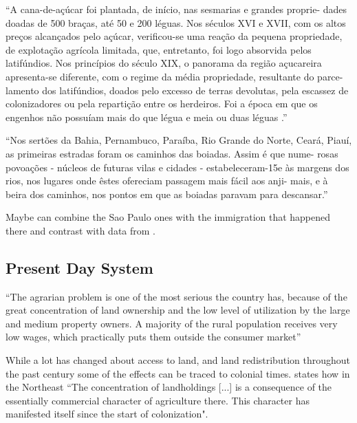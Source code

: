 \documentclass{article}
\begin{document}
``A  cana-de-açúcar foi  plantada,  de  início,  nas sesmarias  e  grandes  proprie- dades  doadas de  500  braças,  até  50  e  200  léguas.  Nos  séculos XVI  e  XVII,  com  os  altos  preços  alcançados  pelo  açúcar,  verificou-se  uma  reação  da  pequena  propriedade,  de  explotação agrícola  limitada,  que,  entretanto,  foi  logo  absorvida  pelos latifúndios. Nos  princípios  do  século  XIX, o panorama da região  açucareira  apresenta-se diferente,  com o  regime da média propriedade, resultante  do parce- lamento  dos  latifúndios,  doados  pelo  excesso  de  terras  devolutas,  pela  escassez  de  colonizadores  ou  pela  repartição  entre  os  herdeiros.  Foi  a  época  em  que  os  engenhos  não  possuíam  mais  do  que  légua  e  meia  ou  duas  léguas .''
\parencite[p.~118]{De_Geografia1970-nk}


``Nos  sertões  da  Bahia,  Pernambuco,  Paraíba,  Rio  Grande  do  Norte,  Ceará,  Piauí, as primeiras estradas foram os  caminhos das boiadas.  Assim  é  que nume- rosas  povoações  - núcleos  de  futuras  vilas  e  cidades  - estabeleceram-15e  às  margens dos rios,  nos lugares onde  êstes ofereciam passagem mais fácil  aos anji- mais,  e  à  beira  dos  caminhos,  nos  pontos  em  que  as  boiadas  paravam  para  descansar.''
\parencite[p.~164]{De_Geografia1970-nk}

\parencite{Panini1990-rj}

Maybe can combine the Sao Paulo ones with the immigration that happened there and contrast with data from \parencite{Rocha2017-yq}.

\subsection{Present Day System}

\textcite[p.~1]{De_Oliveira_Andrade1980-xz}
``The agrarian problem is one of the most serious the country has, because of the great concentration of land ownership and the low level of utilization by the large and medium property owners. A majority of the rural population receives very low wages, which practically puts them outside the consumer market''

While a lot has changed about access to land, and land redistribution throughout the past century some of the effects can be traced to colonial times.
\textcite[p.~36]{De_Oliveira_Andrade1980-xz} states how in the Northeast 
``The concentration of landholdings [...] is a consequence of the essentially commercial character of agriculture there. This character has manifested itself since the start of colonization". 
\end{document}
